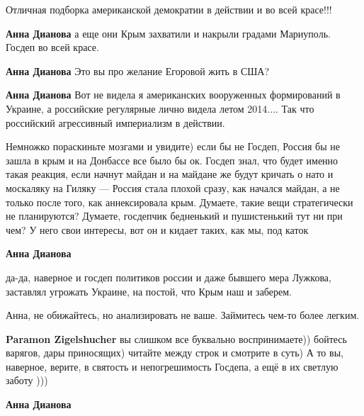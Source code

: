  
 
 
 
 
\zzSecCmt

\begin{itemize} %
Отличная подборка американской демократии в действии и во всей красе!!!

\begin{itemize} %
\textbf{Анна Дианова} а еще они Крым захватили и накрыли градами Мариуполь.
Госдеп во всей красе.

\textbf{Анна Дианова} Это вы про желание Егоровой жить в США?

\textbf{Анна Дианова} Вот не видела я американских вооруженных формирований в Украине, а российские регулярные лично видела летом 2014.... Так что российский агрессивный империализм в действии.


Немножко пораскиньте мозгами и увидите) если бы не Госдеп, Россия бы не зашла в
крым и на Донбассе все было бы ок. Госдеп знал, что будет именно такая реакция,
если начнут майдан и на майдане же будут кричать о нато и москаляку на Гиляку —
Россия стала плохой сразу, как начался майдан, а не только после того, как
аннексировала крым. Думаете, такие вещи стратегически не планируются? Думаете,
госдепчик бедненький и пушистенький тут ни при чем? У него свои интересы, вот
он и кидает таких, как мы, под каток

\textbf{Анна Дианова} 

да-да, наверное и госдеп политиков россии и даже бывшего мера Лужкова,
заставлял угрожать Украине, на постой, что Крым наш и заберем.

Анна, не обижайтесь, но анализировать не ваше. Займитесь чем-то более легким.

\textbf{Paramon Zigelshucher} вы слишком все буквально воспринимаете)) бойтесь варягов, дары приносящих) читайте между строк и смотрите в суть)
А то вы, наверное, верите, в святость и непогрешимость Госдепа, а ещё в их светлую заботу )))

\textbf{Анна Дианова} 


\end{itemize}
\end{itemize}
